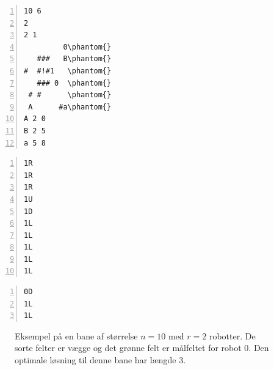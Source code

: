 \documentclass[10pt, a4paper]{article}
\begin{document}
\newsavebox{\simpleboard}
\begin{lrbox}\simpleboard%
\hspace{1cm}
\begin{minipage}[b]{2.1cm}%
\begin{Verbatim}[frame=single, numbers=left, showspaces, commandchars=\\\{\}, baselinestretch=0.64]
10 6
2
2 1
         0\phantom{}
   ###   B\phantom{}
#  #!#1   \phantom{}
   ### 0  \phantom{}
 # #      \phantom{}
 A      #a\phantom{}
A 2 0
B 2 5
a 5 8
\end{Verbatim}
\end{minipage} 
\hspace{1cm}
\end{lrbox}

\newsavebox{\simpleboardsolution}
\begin{lrbox}\simpleboardsolution%
\hspace{1cm}
\begin{minipage}[b]{2.1cm}%
\begin{Verbatim}[frame=single, numbers=left,showspaces, commandchars=\\\{\}, baselinestretch=0.64, label={\scriptsize Løsning 1}]
1R
1R
1R
1U
1D
1L
1L
1L
1L
1L
\end{Verbatim}
\vspace{-4pt}
\begin{Verbatim}[frame=single, numbers=left,showspaces, commandchars=\\\{\}, baselinestretch=0.64, label={\scriptsize Løsning 2}]
0D
1L
1L
\end{Verbatim}
\end{minipage}
\hspace{1cm}
\end{lrbox}

\begin{figure}
\centering
{}
\hspace{0.2cm}
\hspace{0.2cm}
\caption{Eksempel på en bane af størrelse $n=10$ med $r=2$ robotter. De sorte felter er vægge og det grønne felt er målfeltet for robot 0. Den optimale løsning til denne bane har længde 3.}
\label{fig:simpleboardexample}
\end{figure}
\end{document}

